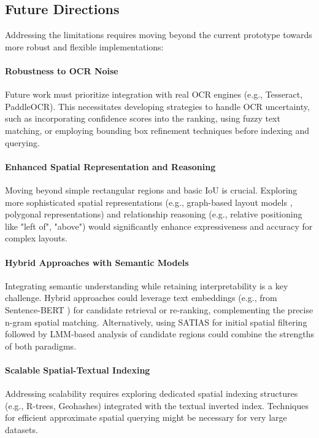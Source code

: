 \documentclass[sigconf,screen]{acmart}
\begin{document}
\subsection{Future Directions}

Addressing the limitations requires moving beyond the current prototype towards more robust and flexible implementations:

\paragraph{Robustness to OCR Noise}
Future work must prioritize integration with real OCR engines (e.g., Tesseract, PaddleOCR). This necessitates developing strategies to handle OCR uncertainty, such as incorporating confidence scores into the ranking, using fuzzy text matching, or employing bounding box refinement techniques before indexing and querying.

\paragraph{Enhanced Spatial Representation and Reasoning}
Moving beyond simple rectangular regions and basic IoU is crucial. Exploring more sophisticated spatial representations (e.g., graph-based layout models \cite{Johnson18SceneGraphs}, polygonal representations) and relationship reasoning (e.g., relative positioning like "left of", "above") would significantly enhance expressiveness and accuracy for complex layouts.

\paragraph{Hybrid Approaches with Semantic Models}
Integrating semantic understanding while retaining interpretability is a key challenge. Hybrid approaches could leverage text embeddings (e.g., from Sentence-BERT \cite{Reimers19SentenceBERT}) for candidate retrieval or re-ranking, complementing the precise n-gram spatial matching. Alternatively, using SATIAS for initial spatial filtering followed by LMM-based analysis of candidate regions could combine the strengths of both paradigms.

\paragraph{Scalable Spatial-Textual Indexing}
Addressing scalability requires exploring dedicated spatial indexing structures (e.g., R-trees, Geohashes) integrated with the textual inverted index. Techniques for efficient approximate spatial querying might be necessary for very large datasets.
\end{document}
